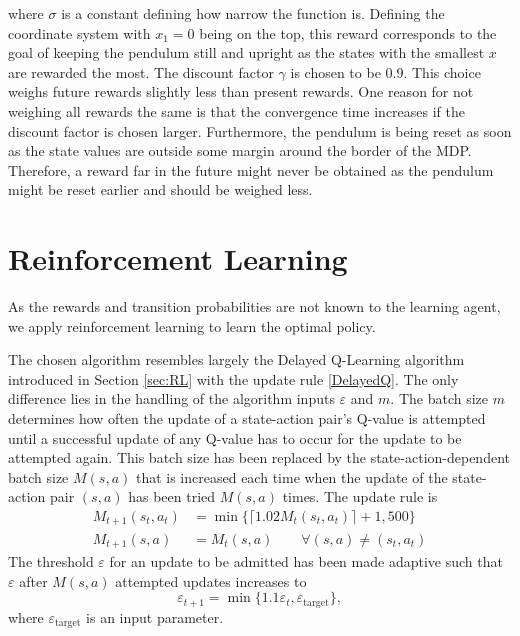 \documentclass[../main.tex]{subfiles}
\begin{document}
where $\sigma$ is a constant defining how narrow the function is. Defining the coordinate system with $x_1 = 0$ being on the top, this reward corresponds to the goal of keeping the pendulum still and upright as the states with the smallest $x$ are rewarded the most. The discount factor $\gamma$ is chosen to be $0.9$. This choice weighs future rewards slightly less than present rewards. One reason for not weighing all rewards the same is that the convergence time increases if the discount factor is chosen larger. Furthermore, the pendulum is being reset as soon as the state values are outside some margin around the border of the MDP. Therefore, a reward far in the future might never be obtained as the pendulum might be reset earlier and should be weighed less.
\section{Reinforcement Learning}
As the rewards and transition probabilities are not known to the learning agent, we apply reinforcement learning to learn the optimal policy. 

The chosen algorithm resembles largely the Delayed Q-Learning algorithm introduced in Section \ref{sec:RL} with the update rule \eqref{DelayedQ}. The only difference lies in the handling of the algorithm inputs $\varepsilon$ and $m$. The batch size $m$ determines how often the update of a state-action pair's Q-value is attempted until a successful update of any Q-value has to occur for the update to be attempted again. This batch size has been replaced by the state-action-dependent batch size $M(s,a)$ that is increased each time when the update of the state-action pair $(s,a)$ has been tried $M(s,a)$ times. The update rule is 
\begin{align}
    M_{t+1}(s_t,a_t) &= \min\{\lceil1.02M_t(s_t,a_t)\rceil+1, 500\}\\
    M_{t+1}(s,a) &= M_t(s,a) \qquad \forall (s,a) \neq (s_t,a_t)
\end{align}
The threshold $\varepsilon$ for an update to be admitted has been made adaptive such that $\varepsilon$ after $M(s,a)$ attempted updates increases to 
\begin{equation}
    \varepsilon_{t+1} = \min\{1.1 \varepsilon_t, \varepsilon_{\text{target}}\}, 
\end{equation}
where $\varepsilon_{\text{target}}$ is an input parameter.
\end{document}
